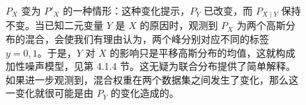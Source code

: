 \begin{figure}[htbp]
\centering
{}
\caption{$P_X$ 变为 $P'_X$ 的一种情形：这种变化提示，$P_Y$ 已改变，而 $P_{X\mid Y}$ 保持不变。当已知二元变量 $Y$ 是 $X$ 的原因时，观测到 $P_X$ 为两个高斯分布的混合，会使我们有理由认为，两个峰分别对应不同的标签 $y=0,1$。于是，$Y$ 对 $X$ 的影响只是平移高斯分布的均值，这就构成加性噪声模型，见第 4.1.4 节。这无疑为联合分布提供了简单解释。如果进一步观测到，混合权重在两个数据集之间发生了变化，那么这一变化就很可能是由 $P_Y$ 的变化造成的。}
\label{fig:ch05-changing-mixture}
\end{figure}
